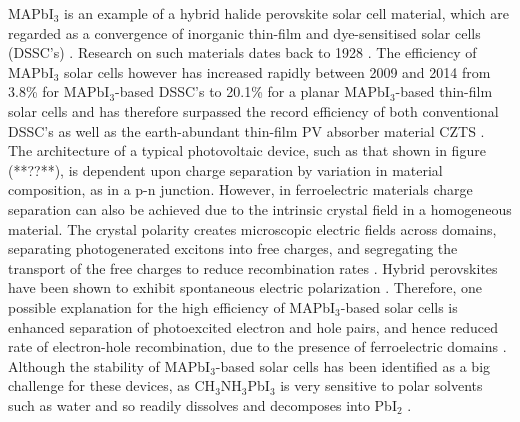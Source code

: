 MAPbI$_3$ is an example of a hybrid halide perovskite solar cell material, which are regarded as a convergence of inorganic thin-film and dye-sensitised solar cells (DSSC's) \cite{Federico}. Research on such materials dates back to 1928 \cite{Jarv_7}. The efficiency of MAPbI$_3$ solar cells however has increased rapidly between 2009 and 2014 from 3.8\% for MAPbI$_3$-based DSSC's to 20.1\% for a planar MAPbI$_3$-based thin-film solar cells \cite{CZTS_vs_MAPI} and has therefore surpassed the record efficiency of both conventional DSSC's as well as the earth-abundant thin-film PV absorber material CZTS \cite{Federico}. The architecture of a typical photovoltaic device, such as that shown in figure (**??**), is dependent upon charge separation by variation in material composition, as in a p-n junction. However, in ferroelectric materials charge separation can also be achieved due to the intrinsic crystal field in a homogeneous material. The crystal polarity creates microscopic electric fields across domains, separating photogenerated excitons into free charges, and segregating the transport of the free charges to reduce recombination rates \cite{keith}. Hybrid perovskites have been shown to exhibit spontaneous electric polarization \cite{Jarv}.
Therefore, one possible explanation for the high efficiency of MAPbI$_3$-based solar cells is enhanced separation of photoexcited electron and hole pairs, and hence reduced rate of electron-hole recombination, due to the presence of ferroelectric domains \cite{Jarv, Federico}. Although the stability of MAPbI$_3$-based solar cells has been identified as a big challenge for these devices, as CH$_3$NH$_3$PbI$_3$ is very sensitive to polar solvents such as water and so readily dissolves and decomposes into PbI$_2$ \cite{MAPI}. \\

